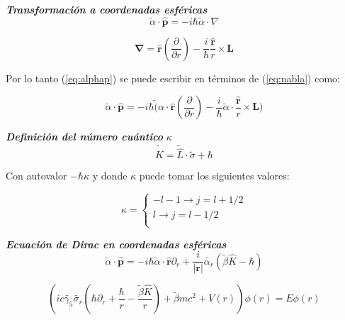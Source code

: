 \documentclass{beamer}
\begin{document}
\begin{frame}{\textit{\textbf{Transformaci\'on a coordenadas esf\'ericas}}}
\begin{equation}\label{eq:alphap}
\widetilde{\alpha} \cdot \hat{\mathbf{p}} = -i \hbar \widetilde{\alpha} \cdot \nabla
\end{equation}

\begin{equation}\label{eq:nabla}
\mathbf{\nabla} =  \hat{\mathbf{r}}(\dfrac{\partial}{\partial r}) - \dfrac{i}{\hbar}\dfrac{\hat{\mathbf{r}}}{r} \times \mathbf{L}
\end{equation}

Por lo tanto (\ref{eq:alphap}) se puede escribir en t\'erminos de (\ref{eq:nabla}) como:

\begin{equation}\label{eq:alphap2}
\widetilde{\alpha}\cdot \mathbf{\hat{p}} = -i\hbar \widetilde({\alpha}\cdot \hat{\mathbf{r}}(\dfrac{\partial}{\partial r}) - 
\dfrac{i}{\hbar}\widetilde{\alpha}\cdot \dfrac{\hat{\mathbf{r}}}{r} \times \mathbf{L})
\end{equation}
\end{frame}

\begin{frame}{\textbf{\textit{Definici\'on del n\'umero cu\'antico}} $\kappa$}
\begin{equation}
\widetilde{\hat{K}} = \widetilde{\hat{L}}\cdot \widetilde{\sigma} + \hbar
\end{equation}

Con autovalor $-\hbar \kappa$ y donde $\kappa$ puede tomar los siguientes
valores:

\[ \kappa = 
\begin{cases}
-l - 1 \rightarrow j = l + 1/2  \\
l \rightarrow j = l - 1/2 \\ 
\end{cases}
\]  

\end{frame}

\begin{frame}{\textit{\textbf{Ecuaci\'on de Dirac en coordenadas esf\'ericas}}}
\begin{equation}\label{alphap4}
\widetilde{\alpha} \cdot \mathbf{\hat{p}} = -i\hbar \widetilde{\alpha}\cdot \hat{\mathbf{r}}\partial_r + \dfrac{i}{|\mathbf{r}|} \widetilde{\alpha_r}(\widetilde{\beta}\hat{K}-\hbar)
\end{equation}

\begin{equation}\label{eq:radialdirac}
\left (ic\widetilde{\gamma_5}\widetilde{\sigma_r} \left (\hbar \partial_r + \dfrac{\hbar}{r} -  \dfrac{\widetilde{\beta}\hat{K}}{r}\right )  + \widetilde{\beta} m c^2 + V(r) \right ) \phi(r) = E \phi (r)
\end{equation}

\end{frame}
\end{document}
